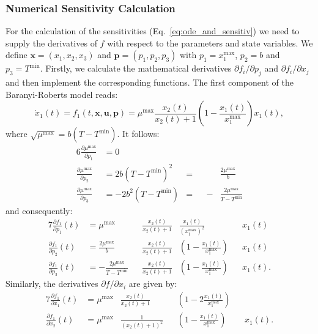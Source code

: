 \documentclass[graybox]{svmult}
\newcommand{\mbx}{\mathbf{x}}
\newcommand{\mbu}{\mathbf{u}}
\newcommand{\mbp}{\mathbf{p}}
\begin{document}
\subsubsection{Numerical Sensitivity Calculation}
For the calculation of the sensitivities (Eq.~\ref{eq:ode_and_sensitiv}) we need to supply the derivatives of $f$ with respect to the parameters and state variables.
We define $\mbx=(x_1,x_2,x_3)$ and $\mbp=(p_1,p_2,p_3)$ with $p_1=x_1^\text{max}$, $p_2=b$ and $p_3=T^\text{min}$.
Firstly, we calculate the mathematical derivatives $\partial f_i/\partial p_j$ and $\partial f_i/\partial x_j$ and then implement the corresponding functions.
The first component of the Baranyi-Roberts model reads:
\begin{equation}
\label{eq:rob_bar_model}
    \dot x_1(t) = f_1(t, \mbx, \mbu, \mbp) = \mu^\text{max} \frac{x_2(t)}{x_2(t) + 1} \left(1 - \frac{x_1(t)}{x_1^\text{max}}\right) x_1(t),
\end{equation}
where $\sqrt{\mu^\text{max}}=b(T-T^\text{min})$.
It follows:
\begin{alignat}{6}
    \frac{\partial\mu^\text{max}}{\partial p_1} &= 0\\
    \frac{\partial\mu^\text{max}}{\partial p_2} &= 2b(T-T^\text{min})^2 &=& &&\frac{2\mu^\text{max}}{b}\\
    \frac{\partial\mu^\text{max}}{\partial p_3} &= -2b^2(T-T^\text{min}) &=& &-&\frac{2\mu^\text{max}}{T-T^\text{min}}
\end{alignat}
and consequently:
\begin{alignat}{7}
    \frac{\partial f_1}{\partial p_1}(t) &= \mu^\text{max} &&\frac{x_2(t)}{x_2(t) + 1} &\frac{x_1(t)}{\left(x_1^\text{max}\right)^2} &&x_1(t)\\
    \frac{\partial f_1}{\partial p_2}(t) &= \frac{2\mu^\text{max}}{b} &&\frac{x_2(t)}{x_2(t) + 1} &\left(1 - \frac{x_1(t)}{x_1^\text{max}}\right) &&x_1(t)\\
    \frac{\partial f_1}{\partial p_3}(t) &= -\frac{2\mu^\text{max}}{T-T^\text{min}} &&\frac{x_2(t)}{x_2(t) + 1} &\left(1 - \frac{x_1(t)}{x_1^\text{max}}\right) &&x_1(t).
\end{alignat}
Similarly, the derivatives $\partial f/\partial x_i$ are given by:
\begin{alignat}{7}
    \frac{\partial f_1}{\partial x_1}(t) &= \mu^\text{max} &\frac{x_2(t)}{x_2(t) + 1} && \left(1-2\frac{x_1(t)}{x_1^\text{max}}\right) &&\\
    \frac{\partial f_1}{\partial x_2}(t) &= \mu^\text{max} &\frac{1}{(x_2(t)+1)^2} && \left(1 - \frac{x_1(t)}{x_1^\text{max}}\right) &&x_1(t).
\end{alignat}
\end{document}
